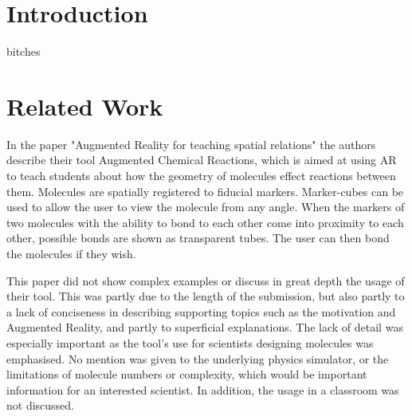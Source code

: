\maketitle
\IEEEdisplaynotcompsoctitleabstractindextext
\IEEEpeerreviewmaketitle
\section{Introduction}

 bitches 

\section{Related Work}

In the paper "Augmented Reality for teaching spatial relations"\cite{Maier09} the authors describe their tool Augmented Chemical Reactions, which is aimed at using AR to teach students about how the geometry of molecules effect reactions between them. Molecules are spatially registered to fiducial markers. Marker-cubes can be used to allow the user to view the molecule from any angle. When the markers of two molecules with the ability to bond to each other come into proximity to each other, possible bonds are shown as transparent tubes. The user can then bond the molecules if they wish.

This paper did not show complex examples or discuss in great depth the usage of their tool. This was partly due to the length of the submission, but also partly to a lack of conciseness in describing supporting topics such as the motivation and Augmented Reality, and partly to superficial explanations. The lack of detail was especially important as the tool's use for scientists designing molecules was emphasised. No mention was given to the underlying physics simulator, or the limitations of molecule numbers or complexity, which would be important information for an interested scientist. In addition, the usage in a classroom was not discussed.

